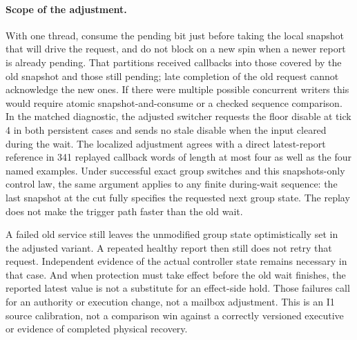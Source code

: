 \documentclass{article}
\begin{document}
\paragraph{Scope of the adjustment.}
With one thread, consume the pending bit just before taking the local
snapshot that will drive the request, and do not block on a new spin
when a newer report is already pending. That partitions received
callbacks into those covered by the old snapshot and those still
pending; late completion of the old request cannot acknowledge the
new ones. If there were multiple possible concurrent writers this
would require atomic snapshot-and-consume or a checked sequence
comparison. In the matched diagnostic, the adjusted switcher
requests the floor disable at tick 4 in both persistent cases and
sends no stale disable when the input cleared during the wait. The
localized adjustment agrees with a direct latest-report reference
in 341 replayed callback words of length at most four as well as
the four named examples. Under successful exact group switches and
this snapshots-only control law, the same argument applies to
any finite during-wait sequence: the last snapshot at the cut
fully specifies the requested next group state. The replay does
not make the trigger path faster than the old wait.

A failed old service still leaves the unmodified group state
optimistically set in the adjusted variant. A repeated healthy report
then still does not retry that request. Independent evidence of
the actual controller state remains necessary in that case.
And when protection must take effect before the old wait finishes,
the reported latest value is not a substitute for an effect-side
hold. Those failures call for an authority or execution change,
not a mailbox adjustment. This is an I1 source calibration,
not a comparison win against a correctly versioned executive or
evidence of completed physical recovery.
\end{document}
